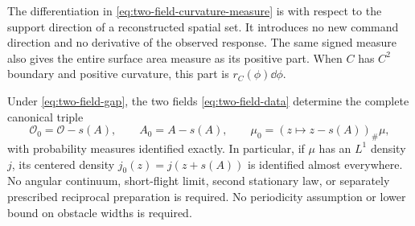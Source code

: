 The differentiation in \eqref{eq:two-field-curvature-measure} is
with respect to the support direction of a reconstructed spatial
set.  It introduces no new command direction and no derivative of
the observed response.  The same signed measure also gives the
entire surface area measure as its positive part.  When $C$ has
$C^2$ boundary and positive curvature, this part is
$r_C(\phi)\dd\phi$.

\begin{theorem}
\label{thm:two-field-rigidity}
Under \eqref{eq:two-field-gap}, the two fields
\eqref{eq:two-field-data} determine the complete canonical triple
\begin{equation}\label{eq:two-field-canonical-triple}
  \mathcal O_0=\mathcal O-s(A),\qquad
  A_0=A-s(A),\qquad \mu_0=(z\mapsto z-s(A))_\#\mu,
\end{equation}
with probability measures identified exactly.  In particular,
if $\mu$ has an $L^1$ density $j$, its centered density
$j_0(z)=j(z+s(A))$ is identified almost everywhere.
No angular continuum, short-flight limit, second stationary law,
or separately prescribed reciprocal preparation is required.
No periodicity assumption or lower bound on obstacle widths is
required.
\end{theorem}
